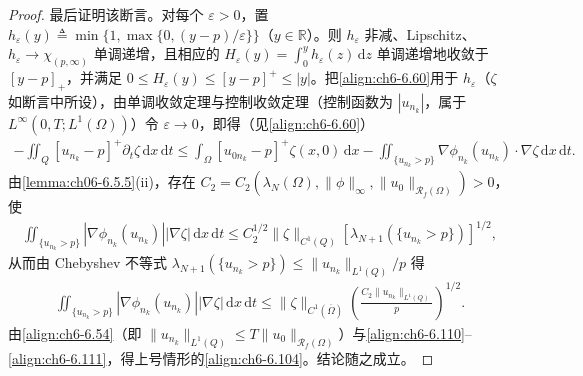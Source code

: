\documentclass[../../main.tex]{subfiles}%
\begin{document}
\begin{proof}
最后证明该断言。对每个 $\varepsilon>0$，置 $h_\varepsilon(y)\triangleq\min\{1,\max\{0,(y-p)/\varepsilon\}\}$（$y\in\mathbb{R}$）。则 $h_\varepsilon$ 非减、Lipschitz、$h_\varepsilon\to\chi_{(p,\infty)}$ 单调递增，且相应的 $H_\varepsilon(y)=\int_0^yh_\varepsilon(z)\,\mathrm{d}z$ 单调递增地收敛于 $[y-p]_+$，并满足 $0\leqslant H_\varepsilon(y)\leqslant[y-p]^+\leqslant|y|$。把\eqref{align:ch6-6.60}用于 $h_\varepsilon$（$\zeta$ 如断言中所设），由单调收敛定理与控制收敛定理（控制函数为 $|u_{n_k}|$，属于 $L^\infty(0,T;L^1(\Omega))$）令 $\varepsilon\to0$，即得（见\eqref{align:ch6-6.60}）
\begin{align}
-\iint_Q[u_{n_k}-p]^+\partial_t\zeta\,\mathrm{d}x\,\mathrm{d}t
\leqslant\int_\Omega[u_{0n_k}-p]^+\zeta(x,0)\,\mathrm{d}x
-\iint_{\{u_{n_k}>p\}}\nabla\phi_{n_k}(u_{n_k})\cdot\nabla\zeta\,\mathrm{d}x\,\mathrm{d}t. \label{align:ch6-6.110}
\end{align}
由\cref{lemma:ch06-6.5.5}(ii)，存在 $C_2=C_2(\lambda_N(\Omega),\|\phi\|_\infty,\|u_0\|_{\mathscr{R}_f(\Omega)})>0$，使
\begin{align*}
\iint_{\{u_{n_k}>p\}}|\nabla\phi_{n_k}(u_{n_k})||\nabla\zeta|\,\mathrm{d}x\,\mathrm{d}t
\leqslant C_2^{1/2}\|\zeta\|_{C^1(Q)}[\lambda_{N+1}(\{u_{n_k}>p\})]^{1/2},
\end{align*}
从而由 Chebyshev 不等式 $\lambda_{N+1}(\{u_{n_k}>p\})\leqslant\|u_{n_k}\|_{L^1(Q)}/p$ 得
\begin{align}
\iint_{\{u_{n_k}>p\}}|\nabla\phi_{n_k}(u_{n_k})||\nabla\zeta|\,\mathrm{d}x\,\mathrm{d}t
\leqslant\|\zeta\|_{C^1(\overline\Omega)}\left(\frac{C_2\|u_{n_k}\|_{L^1(Q)}}{p}\right)^{1/2}. \label{align:ch6-6.111}
\end{align}
由\eqref{align:ch6-6.54}（即 $\|u_{n_k}\|_{L^1(Q)}\leqslant T\|u_0\|_{\mathscr{R}_f(\Omega)}$）与\eqref{align:ch6-6.110}--\eqref{align:ch6-6.111}，得上号情形的\eqref{align:ch6-6.104}。结论随之成立。
\end{proof}
\end{document}
